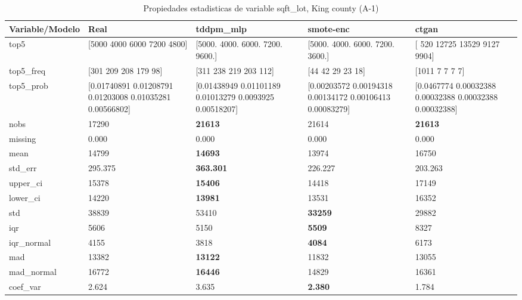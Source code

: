 \begin{table}[H]
\centering
\fontsize{8}{14}\selectfont
\caption{Propiedades  estadisticas de variable sqft\_lot, King county (A-1)}
\label{table-stats-king county-a-1-sqft_lot}
\begin{tabular}{|l|m{10em}|m{10em}|m{10em}|m{10em}|}
\hline
 \rowcolor[gray]{0.8}
Variable/Modelo & Real & tddpm\_mlp & smote-enc & ctgan \\
\hline top5 & [5000 4000 6000 7200 4800] & [5000. 4000. 6000. 7200. 9600.] & [5000. 4000. 6000. 7200. 3600.] & [  520 12725 13529  9127  9904] \\
\hline top5\_freq & [301 209 208 179  98] & [311 238 219 203 112] & [44 42 29 23 18] & [1011    7    7    7    7] \\
\hline top5\_prob & [0.01740891 0.01208791 0.01203008 0.01035281 0.00566802] & [0.01438949 0.01101189 0.01013279 0.0093925  0.00518207] & [0.00203572 0.00194318 0.00134172 0.00106413 0.00083279] & [0.0467774  0.00032388 0.00032388 0.00032388 0.00032388] \\
\hline nobs & 17290 & \bfseries 21613 & \cellcolor[rgb]{0.9, 0.54, 0.52} 21614 & \bfseries 21613 \\
\hline missing & 0.000 & 0.000 & 0.000 & 0.000 \\
\hline mean & 14799 & \bfseries 14693 & 13974 & \cellcolor[rgb]{0.9, 0.54, 0.52} 16750 \\
\hline std\_err & 295.375 & \bfseries 363.301 & 226.227 & \cellcolor[rgb]{0.9, 0.54, 0.52} 203.263 \\
\hline upper\_ci & 15378 & \bfseries 15406 & 14418 & \cellcolor[rgb]{0.9, 0.54, 0.52} 17149 \\
\hline lower\_ci & 14220 & \bfseries 13981 & 13531 & \cellcolor[rgb]{0.9, 0.54, 0.52} 16352 \\
\hline std & 38839 & \cellcolor[rgb]{0.9, 0.54, 0.52} 53410 & \bfseries 33259 & 29882 \\
\hline iqr & 5606 & 5150 & \bfseries 5509 & \cellcolor[rgb]{0.9, 0.54, 0.52} 8327 \\
\hline iqr\_normal & 4155 & 3818 & \bfseries 4084 & \cellcolor[rgb]{0.9, 0.54, 0.52} 6173 \\
\hline mad & 13382 & \bfseries 13122 & \cellcolor[rgb]{0.9, 0.54, 0.52} 11832 & 13055 \\
\hline mad\_normal & 16772 & \bfseries 16446 & \cellcolor[rgb]{0.9, 0.54, 0.52} 14829 & 16361 \\
\hline coef\_var & 2.624 & \cellcolor[rgb]{0.9, 0.54, 0.52} 3.635 & \bfseries 2.380 & 1.784 \\

\end{tabular}
\end{table}
